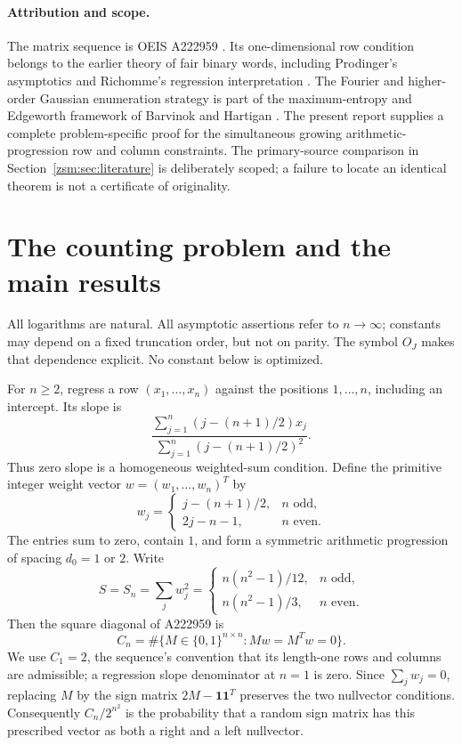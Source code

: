 \documentclass[11pt]{article}
\theoremstyle{definition}\newtheorem{definition}[theorem]{Definition}
\theoremstyle{remark}\newtheorem{remark}[theorem]{Remark}
\begin{document}
\paragraph{Attribution and scope.}
The matrix sequence is OEIS A222959 \cite{oeis959}. Its one-dimensional row
condition belongs to the earlier theory of fair binary words, including
Prodinger's asymptotics and Richomme's regression interpretation
\cite{prodinger,richomme}. The Fourier and higher-order Gaussian enumeration
strategy is part of the maximum-entropy and Edgeworth framework of Barvinok and
Hartigan \cite{bhgaussian,bhedgeworth}. The present report supplies a complete
problem-specific proof for the simultaneous growing arithmetic-progression row
and column constraints. The primary-source comparison in
Section~\ref{zsm:sec:literature} is deliberately scoped; a failure to locate an
identical theorem is not a certificate of originality.

\newpage
{\footnotesize\tableofcontents}
\newpage

\section{The counting problem and the main results}\label{zsm:sec:main}
All logarithms are natural. All asymptotic assertions refer to $n\to\infty$;
constants may depend on a fixed truncation order, but not on parity. The symbol
$O_J$ makes that dependence explicit. No constant below is optimized.

For $n\ge2$, regress a row $(x_1,\ldots,x_n)$ against the positions
$1,\ldots,n$, including an intercept. Its slope is
\[
 \frac{\sum_{j=1}^n(j-(n+1)/2)x_j}
      {\sum_{j=1}^n(j-(n+1)/2)^2}.
\]
Thus zero slope is a homogeneous weighted-sum condition. Define the primitive
integer weight vector $w=(w_1,\ldots,w_n)^T$ by
\begin{equation}\label{zsm:eq:weights}
 w_j=\begin{cases}j-(n+1)/2,&n\text{ odd},\\
                  2j-n-1,&n\text{ even}.
       \end{cases}
\end{equation}
The entries sum to zero, contain $1$, and form a symmetric arithmetic
progression of spacing $d_0=1$ or $2$. Write
\begin{equation}\label{zsm:eq:S}
 S=S_n=\sum_jw_j^2=
 \begin{cases}n(n^2-1)/12,&n\text{ odd},\\
 n(n^2-1)/3,&n\text{ even}.
 \end{cases}
\end{equation}
Then the square diagonal of A222959 is
\[
 C_n=\#\{M\in\{0,1\}^{n\times n}:Mw=M^Tw=0\}.
\]
We use $C_1=2$, the sequence's convention that its length-one rows and columns
are admissible; a regression slope denominator at $n=1$ is zero. Since
$\sum_jw_j=0$, replacing $M$ by the sign matrix $2M-\mathbf1\mathbf1^T$
preserves the two nullvector conditions. Consequently $C_n/2^{n^2}$ is the
probability that a random sign matrix has this prescribed vector as both a
right and a left nullvector.
\end{document}
